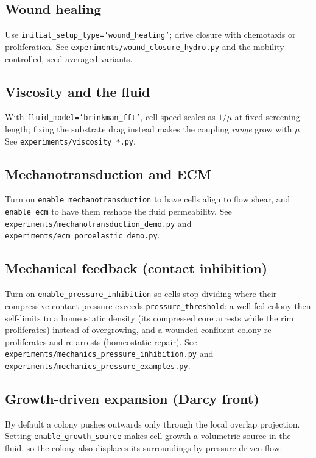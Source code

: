 \documentclass[11pt]{article}
\newcommand{\code}[1]{\texttt{#1}}
\begin{document}
\subsection{Wound healing}
Use \code{initial\_setup\_type='wound\_healing'}; drive closure with chemotaxis
or proliferation. See \code{experiments/wound\_closure\_hydro.py} and the
mobility-controlled, seed-averaged variants.

\subsection{Viscosity and the fluid}
With \code{fluid\_model='brinkman\_fft'}, cell speed scales as $1/\mu$ at fixed
screening length; fixing the substrate drag instead makes the coupling
\emph{range} grow with $\mu$. See \code{experiments/viscosity\_*.py}.

\subsection{Mechanotransduction and ECM}
Turn on \code{enable\_mechanotransduction} to have cells align to flow shear, and
\code{enable\_ecm} to have them reshape the fluid permeability. See
\code{experiments/mechanotransduction\_demo.py} and
\code{experiments/ecm\_poroelastic\_demo.py}.

\subsection{Mechanical feedback (contact inhibition)}
Turn on \code{enable\_pressure\_inhibition} so cells stop dividing where their
compressive contact pressure exceeds \code{pressure\_threshold}: a well-fed colony
then self-limits to a homeostatic density (its compressed core arrests while the
rim proliferates) instead of overgrowing, and a wounded confluent colony
re-proliferates and re-arrests (homeostatic repair). See
\code{experiments/mechanics\_pressure\_inhibition.py} and
\code{experiments/mechanics\_pressure\_examples.py}.

\subsection{Growth-driven expansion (Darcy front)}
By default a colony pushes outwards only through the local overlap projection.
Setting \code{enable\_growth\_source} makes cell growth a volumetric source in the
fluid, so the colony also displaces its surroundings by pressure-driven flow:
\end{document}
